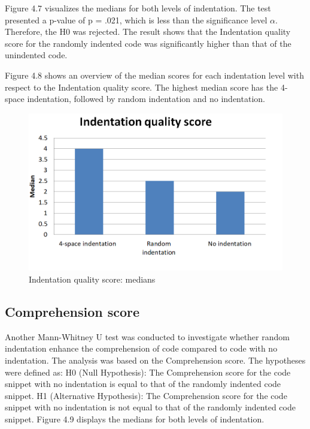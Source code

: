 Figure 4.7 visualizes the medians for both levels of indentation. 
The test presented a p-value of  p = .021, which is less than the significance level \(\alpha \). Therefore, the H0 was rejected. The result shows that the Indentation quality score for the randomly indented code was significantly higher than that of the unindented code.

Figure 4.8 shows an overview of the median scores for each indentation level with respect to the Indentation quality score. The highest median score has the 4-space indentation, followed by random indentation and no indentation.

\begin{figure} [H]
  \centering
  \includegraphics[scale=0.96]{figures/indsM.png}
  \caption{Indentation quality score: medians}
  \label{fig:AnhangsChor}
\end{figure}


\subsection{Comprehension score}
Another Mann-Whitney U test was conducted to investigate whether random indentation enhance the comprehension  of code compared to code with no indentation. The analysis was based on the Comprehension score. The hypotheses were defined as: H0 (Null Hypothesis): The Comprehension score for the code snippet with no indentation is equal to that of the randomly indented code snippet. H1 (Alternative Hypothesis): The Comprehension score for the code snippet with no indentation is not equal to that of the randomly indented code snippet. Figure 4.9 displays the medians for both levels of indentation.



